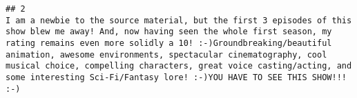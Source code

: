 \documentclass[
]{article}
\begin{document}
\begin{verbatim}
## 2                                                                                                                                                                                                                                                                                                                                                                                                                                                                                                                                                                                                                                                                                                                                                                                                                                                                                                                                                                                                                                                                                                                                                                                                                                                                                                                                                                                                                                                                                                                                                                                                                                                                                                                                                                                                                                                                                                                                                                                                                                                                                                                                                                                                                                                                                                                                                                                                                                                                                                                                                                                                                                   I am a newbie to the source material, but the first 3 episodes of this show blew me away! And, now having seen the whole first season, my rating remains even more solidly a 10! :-)Groundbreaking/beautiful animation, awesome environments, spectacular cinematography, cool musical choice, compelling characters, great voice casting/acting, and some interesting Sci-Fi/Fantasy lore! :-)YOU HAVE TO SEE THIS SHOW!!! :-)

\end{verbatim}
\end{document}
